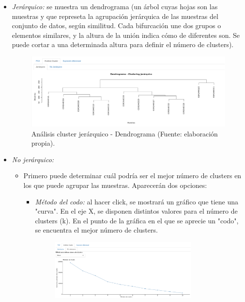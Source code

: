 \begin{itemize}
    \item \textit{Jerárquico:} se muestra un dendrograma (un árbol cuyas hojas son las muestras y que represeta la agrupación jerárquica de las muestras del conjunto de datos, según 
    similitud. Cada bifurcación une dos grupos o elementos similares, y la altura de la unión indica cómo de diferentes son. Se puede cortar a una
    determinada altura para definir el número de clusters).
    \begin{figure}[h]
        \centering
        \includegraphics[width=1\textwidth]{../img/jerarquico.png}
        \caption{Análisis cluster jerárquico - Dendrograma (Fuente: elaboración propia).}
    \end{figure}
    \item \textit{No jerárquico:}
    \begin{itemize}
        \item Primero puede determinar cuál podría ser el mejor número de clusters en los que puede agrupar las muestras. Aparecerán dos opciones:
        \begin{itemize}
            \item \textit{Método del codo:} al hacer click, se mostrará un gráfico que tiene una "curva". En el eje X, se disponen distintos valores para 
            el número de clusters (k). En el punto de la gráfica en el que se aprecie un "codo", se encuentra el mejor número de clusters.
            \begin{figure}[H]
                \centering
                \includegraphics[width=0.8\textwidth]{../img/elbow-app.png}

\end{figure}
\end{itemize}
\end{itemize}
\end{itemize}
